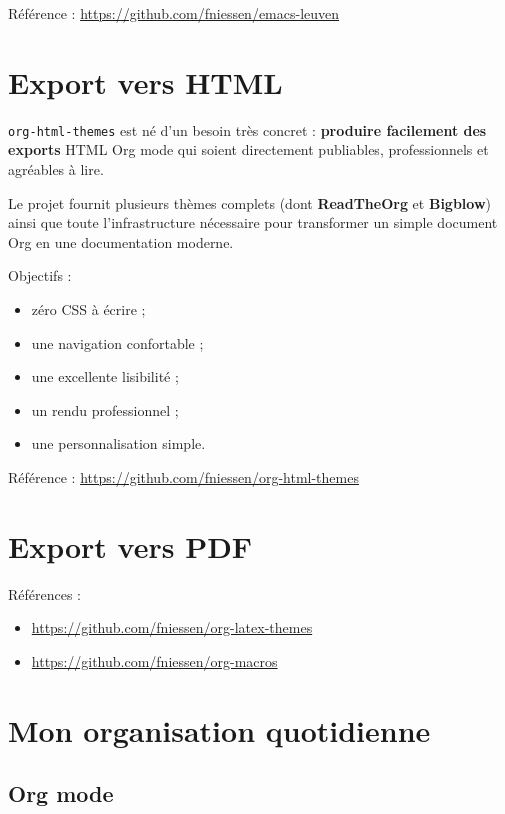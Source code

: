 \documentclass{mcreport}
\begin{document}
Référence : \url{https://github.com/fniessen/emacs-leuven}
\chapter{Export vers HTML}
\label{sec:org0f0c2e0}

\verb|org-html-themes| est né d'un besoin très concret : \textbf{produire facilement des
exports} HTML Org mode qui soient directement publiables, professionnels et
agréables à lire.

Le projet fournit plusieurs thèmes complets (dont \textbf{ReadTheOrg} et \textbf{Bigblow})
ainsi que toute l'infrastructure nécessaire pour transformer un simple document
Org en une documentation moderne.

Objectifs :

\begin{itemize}
\item zéro CSS à écrire ;
\item une navigation confortable ;
\item une excellente lisibilité ;
\item un rendu professionnel ;
\item une personnalisation simple.
\end{itemize}

Référence : \url{https://github.com/fniessen/org-html-themes}
\chapter{Export vers PDF}
\label{sec:org4536a50}

Références :
\begin{itemize}
\item \url{https://github.com/fniessen/org-latex-themes}
\item \url{https://github.com/fniessen/org-macros}
\end{itemize}
\chapter{Mon organisation quotidienne}
\label{sec:orgbde9319}

\section{\texorpdfstring{}{TODO} Org mode\texorpdfstring{}{ (personal)}}
\label{sec:org1136090}
\end{document}
